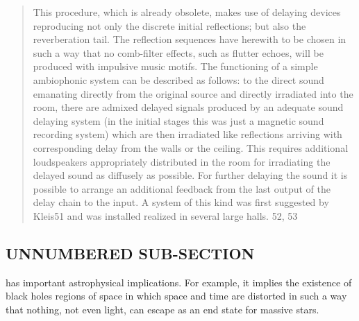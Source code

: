 \begin{quote}
  This procedure, which is already obsolete, makes use of delaying devices
  reproducing not only the discrete initial reflections; but also the
  reverberation tail. The reflection sequences have herewith to be chosen in
  such a way that no comb-filter effects, such as flutter echoes, will be
  produced with impulsive music motifs. The functioning of a simple ambiophonic
  system can be described as follows: to the direct sound emanating directly
  from the original source and directly irradiated into the room, there are
  admixed delayed signals produced by an adequate sound delaying system (in the
  initial stages this was just a magnetic sound recording system) which are
  then irradiated like reflections arriving with corresponding delay from the
  walls or the ceiling. This requires additional loudspeakers appropriately
  distributed in the room for irradiating the delayed sound as diffusely as
  possible. For further delaying the sound it is possible to arrange an additional
  feedback from the last output of the delay chain to the input. A system of this
  kind was first suggested by Kleis51 and was installed realized in several large
  halls. 52, 53 \cite{gb:08}
\end{quote}

\subsection*{UNNUMBERED SUB-SECTION}

\begin{warn}
has important astrophysical implications. For example, it
implies the existence of black holes regions of space in which space and time
are distorted in such a way that nothing, not even light, can escape as an
end state for massive stars.
\end{warn}

